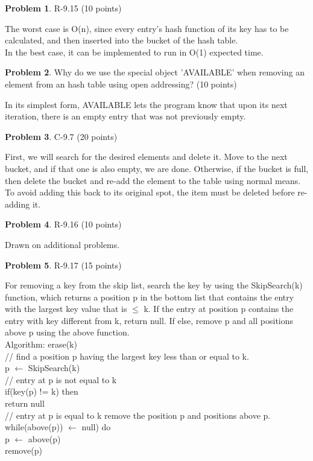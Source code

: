 \documentclass[12pt]{report}
\theoremstyle{definition}
\newtheorem{problem}{Problem}
\begin{document}
\begin{problem} 	R-9.15 (10 points) 		
\end{problem}
				The worst case is O(n), since every entry's hash function of its key has to be calculated, and 				then inserted into the bucket of the hash table. \\
				In the best case, it can be implemented to run in O(1) expected time.

\begin{problem} 	Why do we use the special object 'AVAILABLE' when removing an element from an hash 					table using open addressing? (10 points)	
\end{problem}
				In its simplest form, AVAILABLE lets the program know that upon its next iteration, there is an 				empty entry that was not previously empty. 	
\newpage
\begin{problem} 	C-9.7 (20 points) 		
\end{problem}				
				First, we will search for the desired elements and delete it. Move to the next bucket, and if 				that one is also empty, we are done. Otherwise, if the bucket is full, then delete the bucket 				and re-add the element to the table using normal means. To avoid adding this back to its 					original spot, the item must be deleted before re-adding it.
				
\begin{problem} 	R-9.16 (10 points) 		
\end{problem}	
				Drawn on additional problems.

\begin{problem} 	R-9.17 (15 points) 		
\end{problem}	
				For removing a key from the skip list, search the key by using the SkipSearch(k) function, 					which returns a position p in the bottom list that contains the entry with the largest key value 				that is $\le$ k. If the entry at position p contains the entry with key different from k, return null. 				If else, remove p and all positions above p using the above function. \\
				Algorithm: erase(k) \\
				// find a position p having the largest key less than or equal to k. \\
				p $\leftarrow$ SkipSearch(k) \\
				// entry at p is not equal to k \\
				if(key(p) != k) then \\
				return null \\
				// entry at p is equal to k remove the position p and positions above p. \\
				while(above(p)) $\leftarrow$ null) do \\
				p $\leftarrow$ above(p) \\
				remove(p)
				
\goodbreak
\end{document}
